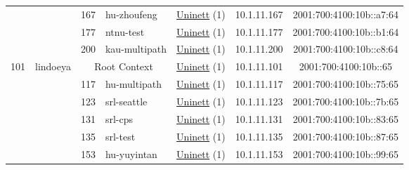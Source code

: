 \begin{small}
\begin{center}
\begin{longtable}{|c|c|c|c|c|c|c|c|}
  &  & \tiny{167} & \multicolumn{1}{|l|}{\tiny{hu-zhoufeng}} & \multicolumn{2}{|c|}{\tiny{\href{https://www.uninett.no}{Uninett} (1)}} & \tiny{10.1.11.167} & \tiny{2001:700:4100:10b::a7:64} \\* \cline{3-3}\cline{4-4}\cline{5-5}\cline{6-6}\cline{7-7}\cline{8-8}
  &  & \tiny{177} & \multicolumn{1}{|l|}{\tiny{ntnu-test}} & \multicolumn{2}{|c|}{\tiny{\href{https://www.uninett.no}{Uninett} (1)}} & \tiny{10.1.11.177} & \tiny{2001:700:4100:10b::b1:64} \\* \cline{3-3}\cline{4-4}\cline{5-5}\cline{6-6}\cline{7-7}\cline{8-8}
  &  & \tiny{200} & \multicolumn{1}{|l|}{\tiny{kau-multipath}} & \multicolumn{2}{|c|}{\tiny{\href{https://www.uninett.no}{Uninett} (1)}} & \tiny{10.1.11.200} & \tiny{2001:700:4100:10b::c8:64} \\ \hline
 \multirow{14}{*}{\tiny{101}} & \multicolumn{1}{|l|}{\multirow{14}{*}{\tiny{lindoeya}}} & \multicolumn{2}{|c|}{\tiny{Root Context}} & \multicolumn{2}{|c|}{\tiny{\href{https://www.uninett.no}{Uninett} (1)}} & \tiny{10.1.11.101} & \tiny{2001:700:4100:10b::65} \\* \cline{3-3}\cline{4-4}\cline{5-5}\cline{6-6}\cline{7-7}\cline{8-8}
  &  & \tiny{117} & \multicolumn{1}{|l|}{\tiny{hu-multipath}} & \multicolumn{2}{|c|}{\tiny{\href{https://www.uninett.no}{Uninett} (1)}} & \tiny{10.1.11.117} & \tiny{2001:700:4100:10b::75:65} \\* \cline{3-3}\cline{4-4}\cline{5-5}\cline{6-6}\cline{7-7}\cline{8-8}
  &  & \tiny{123} & \multicolumn{1}{|l|}{\tiny{srl-seattle}} & \multicolumn{2}{|c|}{\tiny{\href{https://www.uninett.no}{Uninett} (1)}} & \tiny{10.1.11.123} & \tiny{2001:700:4100:10b::7b:65} \\* \cline{3-3}\cline{4-4}\cline{5-5}\cline{6-6}\cline{7-7}\cline{8-8}
  &  & \tiny{131} & \multicolumn{1}{|l|}{\tiny{srl-cps}} & \multicolumn{2}{|c|}{\tiny{\href{https://www.uninett.no}{Uninett} (1)}} & \tiny{10.1.11.131} & \tiny{2001:700:4100:10b::83:65} \\* \cline{3-3}\cline{4-4}\cline{5-5}\cline{6-6}\cline{7-7}\cline{8-8}
  &  & \tiny{135} & \multicolumn{1}{|l|}{\tiny{srl-test}} & \multicolumn{2}{|c|}{\tiny{\href{https://www.uninett.no}{Uninett} (1)}} & \tiny{10.1.11.135} & \tiny{2001:700:4100:10b::87:65} \\* \cline{3-3}\cline{4-4}\cline{5-5}\cline{6-6}\cline{7-7}\cline{8-8}
  &  & \tiny{153} & \multicolumn{1}{|l|}{\tiny{hu-yuyintan}} & \multicolumn{2}{|c|}{\tiny{\href{https://www.uninett.no}{Uninett} (1)}} & \tiny{10.1.11.153} & \tiny{2001:700:4100:10b::99:65} \\* \cline{3-3}\cline{4-4}\cline{5-5}\cline{6-6}\cline{7-7}\cline{8-8}

\end{longtable}
\end{center}
\end{small}
